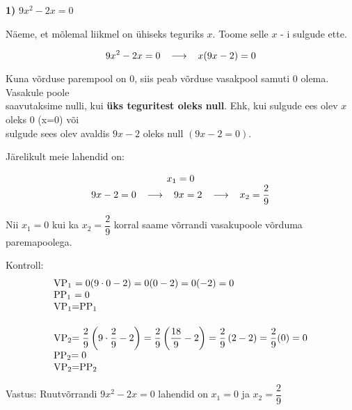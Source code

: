 \begin{center}
{{{\begin{flushleft}
\vspace{2mm}
\hspace{5mm}
\textbf{1)} $9x^{2}-2x=0$

\vspace{2mm}
\hspace{5mm}
Näeme, et mõlemal liikmel on ühiseks teguriks $x$. Toome selle $x$ - i sulgude ette.

\[9x^{2}-2x=0 \hspace{3mm} \longrightarrow \hspace{3mm} x(9x-2)=0  \]

\hspace{5mm}
Kuna võrduse parempool on $0$, siis peab võrduse vasakpool samuti $0$ olema. Vasakule poole\\ \hspace{5mm} saavutaksime nulli, kui \textbf{üks teguritest oleks null}. Ehk, kui sulgude ees olev $x$ oleks 0 (x=0) või\\ \hspace{5mm} sulgude sees olev avaldis $9x-2$ oleks null $(9x-2=0)$.

\vspace{2mm}
\hspace{5mm}
Järelikult meie lahendid on:

\[ \begin{tabular}{c}
$x_{1}=0$\\
$9x-2=0 \hspace{3mm} \longrightarrow \hspace{3mm} 9x=2 \hspace{3mm} \longrightarrow \hspace{3mm} x_{2}=\dfrac{2}{9}$
\end{tabular} \]

\vspace{2mm}
\hspace{5mm}
Nii $x_{1}=0$ kui ka $x_{2}=\dfrac{2}{9}$ korral saame võrrandi vasakupoole võrduma paremapoolega.

\vspace{2mm}
\hspace{5mm}
Kontroll: \[ \begin{tabular}{l}
VP\textsubscript{1} $= 0(9 \cdot 0 -2)= 0(0-2)=0(-2)=0$\\
PP\textsubscript{1} $= 0$\\
VP\textsubscript{1}$=$PP\textsubscript{1} \vspace{5mm}\\

VP\textsubscript{2}$=\dfrac{2}{9} \left( 9\cdot \dfrac{2}{9} - 2 \right) = \dfrac{2}{9} \left( \dfrac{18}{9}-2 \right) = \dfrac{2}{9} \left( 2-2 \right)=\dfrac{2}{9}(0)=0$\\
PP\textsubscript{2}$=0$\\
VP\textsubscript{2}$=$PP\textsubscript{2}
\end{tabular} \]

\vspace{2mm}
\hspace{5mm}
Vastus: Ruutvõrrandi $9x^{2}-2x=0$ lahendid on $x_{1}=0$ ja $x_{2}=\dfrac{2}{9}$
\end{flushleft}
}}}
\end{center}

